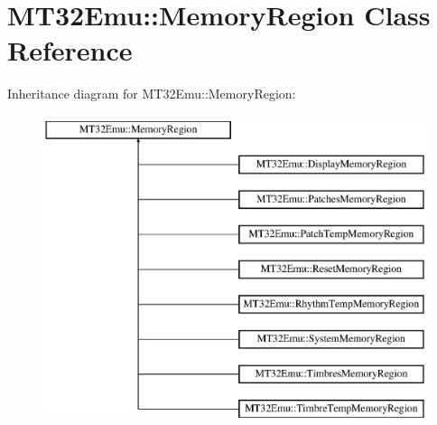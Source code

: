 \hypertarget{classMT32Emu_1_1MemoryRegion}{\section{M\-T32\-Emu\-:\-:Memory\-Region Class Reference}
\label{classMT32Emu_1_1MemoryRegion}
}
Inheritance diagram for M\-T32\-Emu\-:\-:Memory\-Region\-:\begin{figure}[H]
\begin{center}
\leavevmode
\includegraphics[height=9.000000cm]{classMT32Emu_1_1MemoryRegion}
\end{center}
\end{figure}
